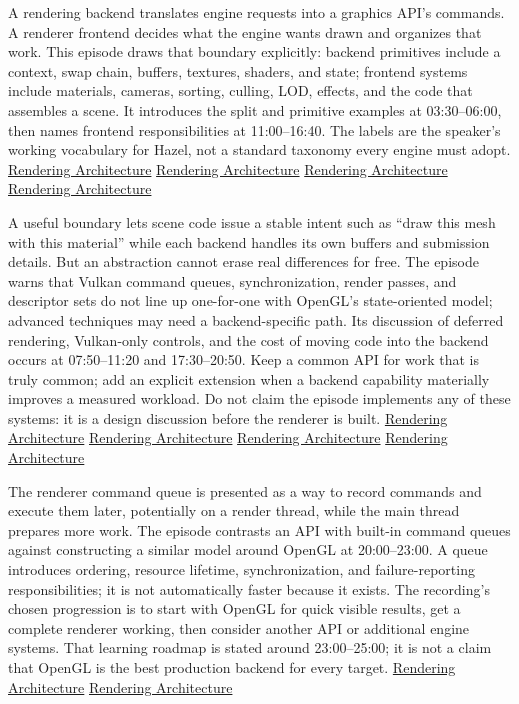 A rendering backend translates engine requests into a graphics API's commands. A renderer frontend decides what the engine wants drawn and organizes that work. This episode draws that boundary explicitly: backend primitives include a context, swap chain, buffers, textures, shaders, and state; frontend systems include materials, cameras, sorting, culling, LOD, effects, and the code that assembles a scene. It introduces the split and primitive examples at 03:30--06:00, then names frontend responsibilities at 11:00--16:40. The labels are the speaker's working vocabulary for Hazel, not a standard taxonomy every engine must adopt. \href{https://www.youtube.com/watch?v=YPWNNmlIUIo&t=210s}{Rendering Architecture} \href{https://www.youtube.com/watch?v=YPWNNmlIUIo&t=330s}{Rendering Architecture} \href{https://www.youtube.com/watch?v=YPWNNmlIUIo&t=660s}{Rendering Architecture} \href{https://www.youtube.com/watch?v=YPWNNmlIUIo&t=890s}{Rendering Architecture}

A useful boundary lets scene code issue a stable intent such as ``draw this mesh with this material'' while each backend handles its own buffers and submission details. But an abstraction cannot erase real differences for free. The episode warns that Vulkan command queues, synchronization, render passes, and descriptor sets do not line up one-for-one with OpenGL's state-oriented model; advanced techniques may need a backend-specific path. Its discussion of deferred rendering, Vulkan-only controls, and the cost of moving code into the backend occurs at 07:50--11:20 and 17:30--20:50. Keep a common API for work that is truly common; add an explicit extension when a backend capability materially improves a measured workload. Do not claim the episode implements any of these systems: it is a design discussion before the renderer is built. \href{https://www.youtube.com/watch?v=YPWNNmlIUIo&t=470s}{Rendering Architecture} \href{https://www.youtube.com/watch?v=YPWNNmlIUIo&t=630s}{Rendering Architecture} \href{https://www.youtube.com/watch?v=YPWNNmlIUIo&t=1050s}{Rendering Architecture} \href{https://www.youtube.com/watch?v=YPWNNmlIUIo&t=1220s}{Rendering Architecture}

The renderer command queue is presented as a way to record commands and execute them later, potentially on a render thread, while the main thread prepares more work. The episode contrasts an API with built-in command queues against constructing a similar model around OpenGL at 20:00--23:00. A queue introduces ordering, resource lifetime, synchronization, and failure-reporting responsibilities; it is not automatically faster because it exists. The recording's chosen progression is to start with OpenGL for quick visible results, get a complete renderer working, then consider another API or additional engine systems. That learning roadmap is stated around 23:00--25:00; it is not a claim that OpenGL is the best production backend for every target. \href{https://www.youtube.com/watch?v=YPWNNmlIUIo&t=1200s}{Rendering Architecture} \href{https://www.youtube.com/watch?v=YPWNNmlIUIo&t=1380s}{Rendering Architecture}

